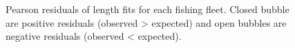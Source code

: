 \documentclass[
]{scrartcl}
\begin{document}
\begin{figure}[H]


\caption{\label{fig-peasrson-resids-fishery}Pearson residuals of length
fits for each fishing fleet. Closed bubble are positive residuals
(observed \textgreater{} expected) and open bubbles are negative
residuals (observed \textless{} expected).}

\end{figure}%
\end{document}
